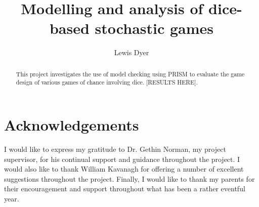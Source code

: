 \documentclass{l4proj}
\begin{document}
\title{Modelling and analysis of dice-based stochastic games}
\author{Lewis Dyer}
\date{}

\maketitle

\begin{abstract}
    This project investigates the use of model checking using PRISM to evaluate the game design of various games of chance involving dice. [RESULTS HERE].
\end{abstract}


%
%
%
\def\consentname {Lewis Dyer}
\def\consentdate {}
\educationalconsent

\chapter*{Acknowledgements}

I would like to express my gratitude to Dr. Gethin Norman, my project supervisor, for his continual support and guidance throughout the project. I would also like to thank William Kavanagh for offering a number of excellent suggestions throughout the project. Finally, I would like to thank my parents for their encouragement and support throughout what has been a rather eventful year.

\tableofcontents
\end{document}
